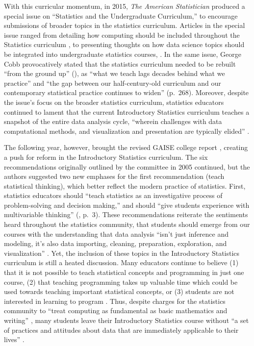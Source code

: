 \documentclass[12pt]{article}
\begin{document}
\quad With this curricular momentum, in 2015, \emph{The American Statistician} 
produced a special issue on ``Statistics and the Undergraduate Curriculum,'' to
encourage submissions of broader topics in the statistics curriculum. Articles 
in the special issue ranged from detailing how computing should be included 
throughout the Statistics curriculum \citep{jenny, tintle, hesterberg}, to 
presenting thoughts on how data science topics should be integrated into 
undergraduate statistics courses, \citep{esr, grimshaw, 
baumer_datascience, hardin}. In the same issue, George Cobb provocatively stated
that the statistics curriculum needed to be rebuilt ``from the ground up'' 
(\citeyear{cobb}), as ``what we teach lags decades behind what we practice'' and
``the gap between our half-century-old curriculum and our contemporary 
statistical practice continues to widen'' (p.\ 268). Moreover, despite the 
issue's focus on the broader statistics curriculum, statistics educators
continued to lament that the current Introductory Statistics curriculum teaches
a snapshot of the entire data analysis cycle, ``wherein challenges with data
computational methods, and visualization and presentation are typically elided'' 
\citep[p.\ 336]{baumer_datascience}. 

\quad The following year, however, brought the revised GAISE college report 
\citep{gaise}, creating a push for reform in the Introductory Statistics 
curriculum. The six recommendations originally outlined by the committee in 2005
continued, but the authors suggested two new emphases for the first
recommendation (teach statistical thinking), which better reflect the modern
practice of statistics. First, statistics educators should ``teach statistics as
an investigative process of problem-solving and decision making,'' and should 
``give students experience with multivariable thinking'' (\citeyear{gaise}, 
p.\ 3). These recommendations reiterate the sentiments heard throughout the
statistics community, that students should emerge from our courses with the
understanding that data analysis ``isn't just inference and modeling, it's also
data importing, cleaning, preparation, exploration, and visualization'' 
\citep{mine-jsm}. Yet, the inclusion of these topics in the Introductory 
Statistics curriculum is still a heated discussion. Many educators continue to 
believe (1) that it is not possible to teach statistical concepts and 
programming in just one course, (2) that teaching programming takes up valuable
time which could be used towards teaching important statistical concepts, or 
(3) students are not interested in learning to program \citep{mine-jsm}. Thus, 
despite charges for the statistics community to ``treat computing as fundamental
as basic mathematics and writing'' \citep[p.\ 298]{esr}, many students leave
their Introductory Statistics course without ``a set of practices and attitudes
about data that are immediately applicable to their lives'' 
\citep[p.\ 309]{gould}. 
\end{document}
